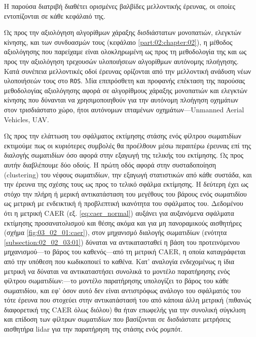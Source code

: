 Η παρούσα διατριβή διαθέτει ορισμένες βαλβίδες μελλοντικής έρευνας, οι οποίες
εντοπίζονται σε κάθε κεφάλαιό της.

Ως προς την αξιολόγηση αλγορίθμων χάραξης δισδιάστατων μονοπατιών, ελεγκτών
κίνησης, και των συνδυασμών τους (κεφάλαιο \ref{part:02:chapter:02}), η μέθοδος
αξιολόγησης που παρείχαμε είναι ολοκληρωμένη ως προς τη μεθοδολογία της και ως
προς την αξιολόγηση τρεχουσών υλοποιήσεων αλγορίθμων αυτόνομης πλοήγησης. Κατά
συνέπεια μελλοντικές οδοί έρευνας ορίζονται από την μελλοντική ανάδυση νέων
υλοποιήσεών τους στο \texttt{ROS}. Μία επιπρόσθετη και προφανής επέκταση της
παρούσας μεθοδολογίας αξιολόγησης αφορά σε αλγορίθμους χάραξης μονοπατιών και
ελεγκτών κίνησης που δύνανται να χρησιμοποιηθούν για την αυτόνομη πλοήγηση
οχημάτων στον τρισδιάστατο χώρο, ήτοι αυτόνομων ιπταμένων οχημάτων---Unmanned
Aerial Vehicles, UAV.

Ως προς την ελάττωση του σφάλματος εκτίμησης στάσης ενός φίλτρου σωματιδίων
εκτιμούμε πως οι κυριότερες συμβολές θα προέλθουν μέσω περαιτέρω έρευνας επί
της διαλογής σωματιδίων όσο αφορά στην εξαγωγή της τελικής του εκτίμησης. Ως
προς αυτήν διαβλέπουμε δύο οδούς. Η πρώτη οδός αφορά στην συσταδοποίηση
(clustering) του νέφους σωματιδίων, την εξαγωγή στατιστικών από κάθε συστάδα,
και την έρευνα της σχέσης τους ως προς το τελικό σφάλμα εκτίμησης.  Η δεύτερη
έχει ως στόχο την πλήρη ή μερική αντικατάσταση του μεγέθους του βάρους ενός
σωματιδίου ως μετρική με ενδεικτική ή προβλεπτική ικανότητα του σφάλματος του.
Δεδομένου ότι η μετρική CAER (εξ. \ref{eq:caer_normal}) αυξάνει για αυξανόμενα
σφάλματα εκτίμησης προσανατολισμού και θέσης ακόμα και για μη πανοραμικούς
αισθητήρες (σχήμα \ref{fig:03_02_01:caer}), στον μηχανισμό διαλογής σωματιδίων
(ενότητα \ref{subsection:02_02_03:01}) δύναται να αντικατασταθεί η βάση του
προτεινόμενου μηχανισμού---το βάρος του καθενός---από τη μετρική CAER, η οποία
καταγράφεται από την υπόθεση που κωδικοποιεί το καθένα. Κατ' αναλογία
ενδεχομένως η ίδια μετρική να δύναται να αντικαταστήσει συνολικά το μοντέλο
παρατήρησης ενός φίλτρου σωματιδίων:---το μοντέλο παρατήρησης υπολογίζει το
βάρος του κάθε σωματιδίου, και εφ' όσον αυτό δεν είναι αντιστρόφως ανάλογο του
σφάλματός του τότε έρευνα που στοχεύει στην αντικατάστασή του από κάποια άλλη
μετρική (πιθανώς διαφορετική της CAER όλως διόλου) θα ήταν επωφελής για την
συνολική σύγκλιση και επίδοση των φίλτρων σωματιδίων που βασίζονται σε
δισδιάστατε μετρήσεις αισθητήρα lidar για την παρατήρηση της στάσης ενός ρομπότ.


